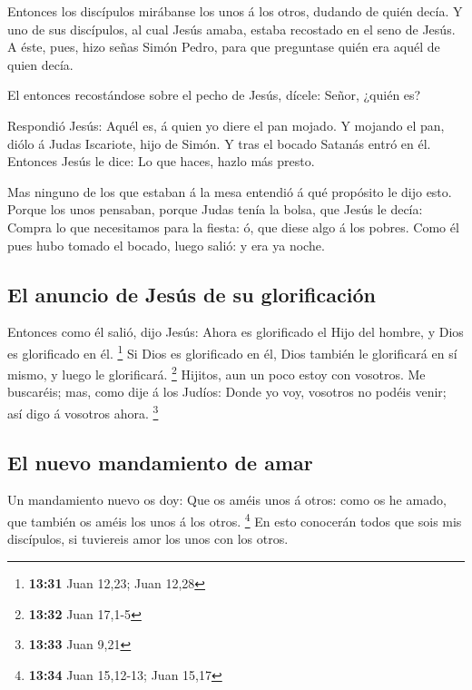  Entonces los discípulos mirábanse los unos á los otros,
dudando de quién decía.  Y uno de sus discípulos, al cual
Jesús amaba, estaba recostado en el seno de Jesús.  A
éste, pues, hizo señas Simón Pedro, para que preguntase quién era aquél
de quien decía.

 El entonces recostándose sobre el pecho de Jesús,
dícele: Señor, ¿quién es?

 Respondió Jesús: Aquél es, á quien yo diere el pan
mojado. Y mojando el pan, diólo á Judas Iscariote, hijo de Simón.
 Y tras el bocado Satanás entró en él. Entonces Jesús le
dice: Lo que haces, hazlo más presto.

 Mas ninguno de los que estaban á la mesa entendió á qué
propósito le dijo esto.  Porque los unos pensaban, porque
Judas tenía la bolsa, que Jesús le decía: Compra lo que necesitamos para
la fiesta: ó, que diese algo á los pobres.  Como él pues
hubo tomado el bocado, luego salió: y era ya noche.

\hypertarget{el-anuncio-de-jesuxfas-de-su-glorificaciuxf3n}{%
\subsection{El anuncio de Jesús de su
glorificación}\label{el-anuncio-de-jesuxfas-de-su-glorificaciuxf3n}}

 Entonces como él salió, dijo Jesús: Ahora es glorificado
el Hijo del hombre, y Dios es glorificado en él. \footnote{\textbf{13:31}
  Juan 12,23; Juan 12,28}  Si Dios es glorificado en él,
Dios también le glorificará en sí mismo, y luego le glorificará.
\footnote{\textbf{13:32} Juan 17,1-5}  Hijitos, aun un
poco estoy con vosotros. Me buscaréis; mas, como dije á los Judíos:
Donde yo voy, vosotros no podéis venir; así digo á vosotros ahora.
\footnote{\textbf{13:33} Juan 9,21}

\hypertarget{el-nuevo-mandamiento-de-amar}{%
\subsection{El nuevo mandamiento de
amar}\label{el-nuevo-mandamiento-de-amar}}

 Un mandamiento nuevo os doy: Que os améis unos á otros:
como os he amado, que también os améis los unos á los otros. \footnote{\textbf{13:34}
  Juan 15,12-13; Juan 15,17}  En esto conocerán todos que
sois mis discípulos, si tuviereis amor los unos con los otros.

